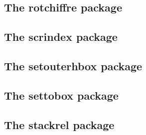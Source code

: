 \documentclass[a4paper,12pt]{article}
\makeatletter
\newcommand*{\xpackage}[1]{\textsf{#1}}
\newcommand*{\xoption}[1]{\textsf{#1}}
\newcommand*{\cs}[1]{\texttt{\textbackslash#1}}
\newcommand*{\tocinclude}[1]{%
  \setcounter{tocdepth}{3}%
  \begingroup
    \makeatletter
    \def\@prj{#1}%
    \let\contentsline\foreign@contentsline
  \endgroup
}
\def\foreign@contentsline#1#2#3#4{%
  \ifx\\#4\\%
    \csname l@#1\endcsname{#2}{#3}%
  \else
    \ifHy@linktocpage
      \csname l@#1\endcsname{{#2}}{%
        \hyper@linkfile{#3}{\@prj.pdf}{#4}%
      }%
    \else
      \csname l@#1\endcsname{%
        \hyper@linkfile{#2}{\@prj.pdf}{#4}%
      }{#3}%
    \fi
  \fi
}%
\newcommand*{\pkgsectformat}[1]{%
  \texorpdfstring{%
    \textcolor{link}{The} %
    \xpackage{#1} %
    \textcolor{link}{package}%
  }{#1}%
}
\makeatother
\begin{document}
\newpage
\subsection{\pkgsectformat{rotchiffre}}
\label{rotchiffre}
\begin{abstract}
This package implements chiffres ROT13 with its variants
ROT5, ROT18, and ROT47.
\end{abstract}
\tocinclude{rotchiffre}

\newpage
\subsection{\pkgsectformat{scrindex}}
\label{scrindex}
\begin{abstract}
This package redefines environment `theindex' of package \xpackage{index},
if a class from KOMA-Script is loaded. Also option \xoption{idxtotoc}
is supported. Index preambles can be given either by means of package
\xpackage{index} or via the interface provided by KOMA-Script.
\end{abstract}
\tocinclude{scrindex}

\newpage
\subsection{\pkgsectformat{setouterhbox}}
\label{setouterhbox}
\begin{abstract}
If math stuff is set in an \cs{hbox}, then TeX
performs some optimization and omits the implicit
penalties \cs{binoppenalty} and \cs{relpenalty}.
This packages tries to put stuff into an \cs{hbox}
without getting lost of those penalties.
\end{abstract}
\tocinclude{setouterhbox}

\newpage
\subsection{\pkgsectformat{settobox}}
\label{settobox}
\begin{abstract}
Commands are defined for getting box sizes similar
to \LaTeX's \cs{settowidth} commands.
\end{abstract}
\tocinclude{settobox}

\newpage
\subsection{\pkgsectformat{stackrel}}
\label{stackrel}
\begin{abstract}
This package adds an optional argument to \cs{stackrel} for
putting something below the relational symbol and defines
\cs{stackbin} for binary symbols.
\end{abstract}
\tocinclude{stackrel}
\end{document}

